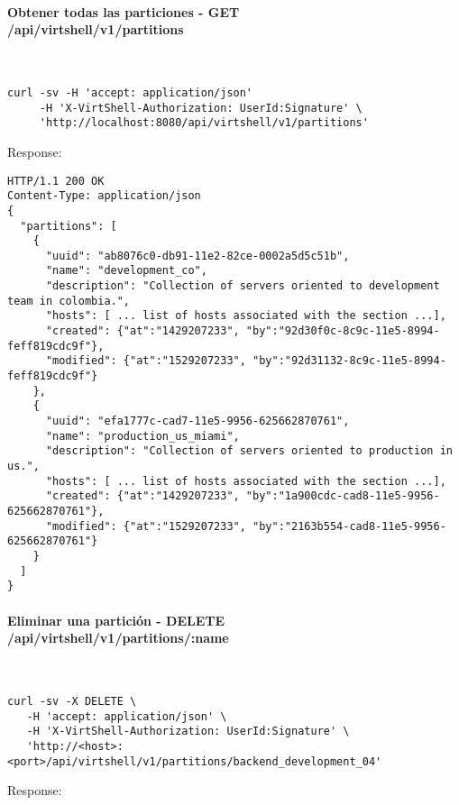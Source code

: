 \paragraph{Obtener todas las particiones -  GET \\ /api/virtshell/v1/partitions} ~\\

\begin{lstlisting}[style=json]
curl -sv -H 'accept: application/json' 
     -H 'X-VirtShell-Authorization: UserId:Signature' \ 
     'http://localhost:8080/api/virtshell/v1/partitions'
\end{lstlisting}

Response:

\begin{lstlisting}[style=json]
HTTP/1.1 200 OK
Content-Type: application/json
{
  "partitions": [
    {
      "uuid": "ab8076c0-db91-11e2-82ce-0002a5d5c51b",
      "name": "development_co",
      "description": "Collection of servers oriented to development team in colombia.",
      "hosts": [ ... list of hosts associated with the section ...],
      "created": {"at":"1429207233", "by":"92d30f0c-8c9c-11e5-8994-feff819cdc9f"},
      "modified": {"at":"1529207233", "by":"92d31132-8c9c-11e5-8994-feff819cdc9f"}
    },
    { 
      "uuid": "efa1777c-cad7-11e5-9956-625662870761",
      "name": "production_us_miami",
      "description": "Collection of servers oriented to production in us.",
      "hosts": [ ... list of hosts associated with the section ...],      
      "created": {"at":"1429207233", "by":"1a900cdc-cad8-11e5-9956-625662870761"},
      "modified": {"at":"1529207233", "by":"2163b554-cad8-11e5-9956-625662870761"}
    }    
  ]
}  
\end{lstlisting}

\paragraph{Eliminar una partición - DELETE \\ /api/virtshell/v1/partitions/:name} ~\\

\begin{lstlisting}[style=json]
curl -sv -X DELETE \
   -H 'accept: application/json' \
   -H 'X-VirtShell-Authorization: UserId:Signature' \
   'http://<host>:<port>/api/virtshell/v1/partitions/backend_development_04'
\end{lstlisting}

Response:


